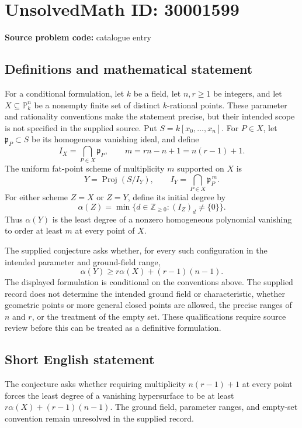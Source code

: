 \documentclass[11pt]{article}
\newcommand{\Z}{\mathbb{Z}}
\newcommand{\PP}{\mathbb{P}}
\begin{document}
\section*{UnsolvedMath ID: 30001599}
\textbf{Source problem code:} catalogue entry
\subsection{Definitions and mathematical statement}
For a conditional formulation, let \(k\) be a field, let \(n,r\geq 1\) be integers, and let \(X\subseteq\PP^n_k\) be a nonempty finite set of distinct \(k\)-rational points. These parameter and rationality conventions make the statement precise, but their intended scope is not specified in the supplied source. Put \(S=k[x_0,\ldots,x_n]\). For \(P\in X\), let \(\mathfrak p_P\subset S\) be its homogeneous vanishing ideal, and define
\[
I_X=\bigcap_{P\in X}\mathfrak p_P,\qquad m=rn-n+1=n(r-1)+1.
\]
The uniform fat-point scheme of multiplicity \(m\) supported on \(X\) is
\[
Y=\operatorname{Proj}(S/I_Y),\qquad I_Y=\bigcap_{P\in X}\mathfrak p_P^{\,m}.
\]
For either scheme \(Z=X\) or \(Z=Y\), define its initial degree by
\[
\alpha(Z)=\min\{d\in\Z_{\geq0}:(I_Z)_d\neq\{0\}\}.
\]
Thus \(\alpha(Y)\) is the least degree of a nonzero homogeneous polynomial vanishing to order at least \(m\) at every point of \(X\).

The supplied conjecture asks whether, for every such configuration in the intended parameter and ground-field range,
\[
\alpha(Y)\geq r\alpha(X)+(r-1)(n-1).
\]
The displayed formulation is conditional on the conventions above. The supplied record does not determine the intended ground field or characteristic, whether geometric points or more general closed points are allowed, the precise ranges of \(n\) and \(r\), or the treatment of the empty set. These qualifications require source review before this can be treated as a definitive formulation.
\subsection{Short English statement}
The conjecture asks whether requiring multiplicity \(n(r-1)+1\) at every point forces the least degree of a vanishing hypersurface to be at least \(r\alpha(X)+(r-1)(n-1)\). The ground field, parameter ranges, and empty-set convention remain unresolved in the supplied record.
\end{document}

